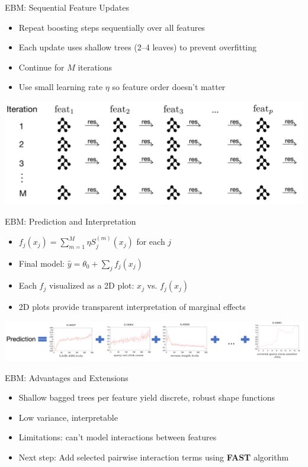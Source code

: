 \documentclass[11pt,compress,t,notes=noshow,aspectratio=169,xcolor=table]{beamer}
\begin{document}
\begin{frame}{EBM: Sequential Feature Updates} \begin{itemize} \item Repeat boosting steps sequentially over all features \item Each update uses shallow trees (2--4 leaves) to prevent overfitting \item Continue for $M$ iterations \item Use small learning rate $\eta$ so feature order doesn't matter \end{itemize} \includegraphics[width=1\linewidth]{figure/EBM_Step3.png} \end{frame}

\begin{frame}{EBM: Prediction and Interpretation} \begin{itemize} \item $f_j(x_j) = \sum_{m=1}^{M} \eta S_j^{(m)}(x_j)$ for each $j$ \item Final model: $\hat{y} = \theta_0 + \sum_j f_j(x_j)$ \item Each $f_j$ visualized as a 2D plot: $x_j$ vs. $f_j(x_j)$ \item 2D plots provide transparent interpretation of marginal effects \end{itemize} \includegraphics[width=1.3\linewidth]{figure/ebm_prediction.png} \end{frame}

\begin{frame}{EBM: Advantages and Extensions} \begin{itemize} \item Shallow bagged trees per feature yield discrete, robust shape functions \item Low variance, interpretable \item Limitations: can't model interactions between features \item Next step: Add selected pairwise interaction terms using \textbf{FAST} algorithm  \end{itemize} \end{frame}
\end{document}
